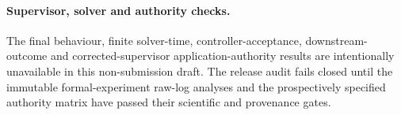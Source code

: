 \paragraph{Supervisor, solver and authority checks.}
\label{sec:supervisor-feedback-closure-results}

The final behaviour, finite solver-time, controller-acceptance, downstream-
outcome and corrected-supervisor application-authority results are intentionally
unavailable in this non-submission draft. The release audit fails closed until
the immutable formal-experiment raw-log analyses and the prospectively
specified authority matrix have passed their scientific and provenance gates.
